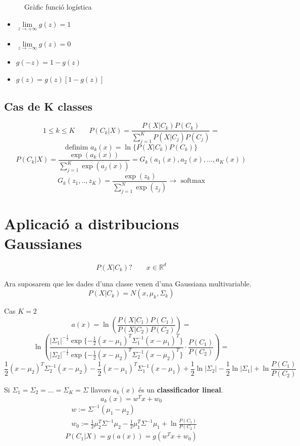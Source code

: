 \documentclass[a4paper]{article}
\begin{document}
\begin{figure}[H]
	\centering
	\caption{Gràfic funció logística}
	\label{fig:logistic}
\end{figure}

\begin{itemize}
	\item $ \lim\limits_{z \to +\infty} g(z) = 1 $
	\item $ \lim\limits_{z \to -\infty} g(z) = 0 $
	\item $ g(-z) = 1 - g(z) $
	\item $ g(z) = g(z)[1 - g(z)] $
\end{itemize}

\subsection{Cas de K classes}
$$
1 \le k \le K \qquad P(C_k | X) = \frac{P(X|C_k)P(C_k)}{\sum_{j=1}^K P(X|C_j)P(C_j)} =
$$
$$
\text{definim } a_k(x) = \ln\{P(X|C_k)P(C_k)\}
$$
$$
P(C_k|X) = \frac{\exp(a_k(x))}{\sum_{j=1}^K \exp(a_j(x))} = G_k (a_1(x), a_2(x),...,a_K(x))
$$
$$
G_k(z_1,..,z_K) = \frac{\exp(z_k)}{\sum_{j=1}^N \exp(z_j)} \longrightarrow \text{ softmax}
$$

\section{Aplicació a distribucions Gaussianes}
$$
P(X|C_k) ? \qquad x \in \mathbb{R}^d
$$

Ara suposarem que les dades d'una classe venen d'una Gaussiana multivariable.
$$
P(X|C_k) = N(x, \mu_k, \Sigma_k)
$$

Cas $K=2$
$$
a(x) = \ln \left( \frac{P(X|C_1)P(C_1)}{P(X|C_2)P(C_2)} \right) =
$$
$$
\ln \left( \frac{|\Sigma_1|^{-\frac{1}{2}} 
	\exp\{ -\frac{1}{2}(x - \mu_1)^T \Sigma_1^{-1}(x - \mu_1)^T \} }
	{|\Sigma_2|^{-\frac{1}{2}} 
	\exp\{ -\frac{1}{2}(x - \mu_2)^T \Sigma_2^{-1}(x - \mu_2)^T \}} ·
\frac{P(C_1)}{P(C_2)}\right) =
$$
$$
\frac{1}{2}(x - \mu_2)^T \Sigma_2^{-1} (x - \mu_2) - \frac{1}{2}(x - \mu_1)^T 
\Sigma_1^{-1}(x - \mu_1) + \frac{1}{2}\ln|\Sigma_2| - \frac{1}{2}\ln|\Sigma_1| + 
\ln \frac{P(C_1)}{P(C_2)}
$$

Si $\Sigma_1 = \Sigma_2 = ... = \Sigma_K = \Sigma$ llavors $a_k(x)$ és un \textbf{classificador lineal}.
$$
a_k(x) = w^T x + w_0
$$
\begin{align*}
	& w := \Sigma^{-1}(\mu_1 - \mu_2) \\
	& w_0 := \frac{1}{2} \mu_2^T \Sigma^{-1}\mu_2 - \frac{1}{2}\mu_1^T \Sigma^{-1}\mu_1
	+ \ln \frac{P(C_1)}{P(C_2)}
\end{align*}
$$
P(C_1|X) = g(a(x)) = g(w^Tx + w_0)
$$
\end{document}
